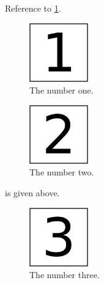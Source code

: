 Reference to \cref{fig:1}.

\begin{figure}
\hypertarget{fig:1}{%
\centering
\includegraphics[width=1in,height=\textheight]{img/fig-1.png}
\caption{The number one.}\label{fig:1}
}
\end{figure}

\begin{figure}
\hypertarget{fig:2}{%
\centering
\includegraphics[width=1in,height=\textheight]{img/fig-2.png}
\caption{The number two.}\label{fig:2}
}
\end{figure}

 is given above.

\begin{figure}
\hypertarget{fig:}{%
\centering
\includegraphics[width=1in,height=\textheight]{img/fig-3.png}
\caption{The number three.}\label{fig:}
}
\end{figure}
